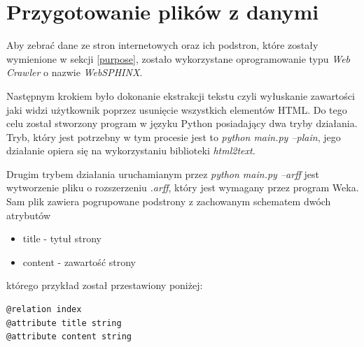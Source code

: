 \documentclass{classrep}
\begin{document}
    \section{Przygotowanie plików z danymi} {
        Aby zebrać dane ze stron internetowych oraz ich podstron, które zostały
        wymienione w sekcji \ref{purpose}, zostało wykorzystane oprogramowanie typu
        \textit{Web Crawler} o nazwie \textit{WebSPHINX}\cite{websphinx}.

        Następnym krokiem było dokonanie ekstrakcji tekstu czyli wyłuskanie zawartości
        jaki widzi użytkownik poprzez usunięcie wszystkich elementów HTML. Do tego celu
        został stworzony program w języku Python posiadający dwa tryby działania. Tryb,
        który jest potrzebny w tym procesie jest to \textit{python main.py --plain},
        jego działanie opiera się na wykorzystaniu biblioteki
        \emph{html2text}\cite{html2text}.

        Drugim trybem działania uruchamianym przez \textit{python main.py --arff} jest
        wytworzenie pliku o rozszerzeniu \textit{.arff}, który jest wymagany przez
        program Weka\cite{weka}. Sam plik zawiera pogrupowane podstrony z zachowanym
        schematem dwóch atrybutów
        \begin{itemize}
            \item title - tytuł strony
            \item content - zawartość strony
        \end{itemize}
        którego przykład został przestawiony poniżej:

        \begin{lstlisting}
@relation index
@attribute title string
@attribute content string
        \end{lstlisting}
    }
\end{document}
